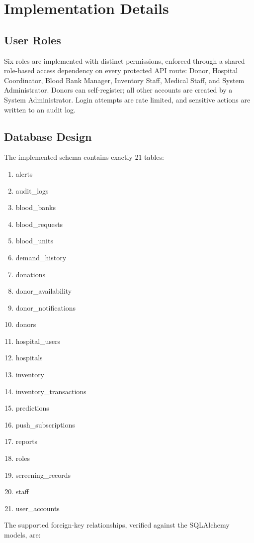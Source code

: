 \documentclass[12pt,a4paper,twoside]{report}
\begin{document}
\section{Implementation Details}
\subsection{User Roles}
Six roles are implemented with distinct permissions, enforced through a shared role-based access dependency on every protected API route: Donor, Hospital Coordinator, Blood Bank Manager, Inventory Staff, Medical Staff, and System Administrator. Donors can self-register; all other accounts are created by a System Administrator. Login attempts are rate limited, and sensitive actions are written to an audit log.

\subsection{Database Design}\label{sec:db}
The implemented schema contains exactly 21 tables:
\begin{enumerate}[itemsep=9pt]
\item alerts
\item audit\_logs
\item blood\_banks
\item blood\_requests
\item blood\_units
\item demand\_history
\item donations
\item donor\_availability
\item donor\_notifications
\item donors
\item hospital\_users
\item hospitals
\item inventory
\item inventory\_transactions
\item predictions
\item push\_subscriptions
\item reports
\item roles
\item screening\_records
\item staff
\item user\_accounts
\end{enumerate}
The supported foreign-key relationships, verified against the SQLAlchemy models, are:
\end{document}
